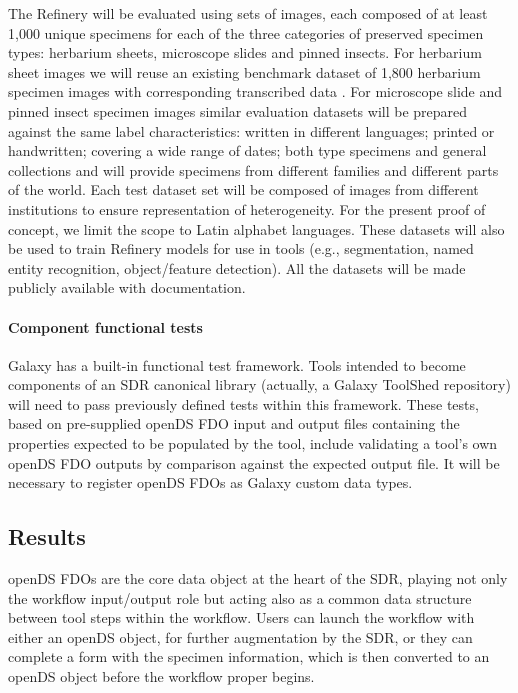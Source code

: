 The Refinery will be evaluated using sets of images, each composed of at
least 1,000 unique specimens for each of the three categories of
preserved specimen types: herbarium sheets, microscope slides and pinned
insects. For herbarium sheet images we will reuse an existing benchmark
dataset of 1,800 herbarium specimen images with corresponding
transcribed data \cite{ch8-59}. For microscope slide and pinned insect
specimen images similar evaluation datasets will be prepared against the
same label characteristics: written in different languages; printed or
handwritten; covering a wide range of dates; both type specimens and
general collections and will provide specimens from different families
and different parts of the world. Each test dataset set will be composed
of images from different institutions to ensure representation of
heterogeneity. For the present proof of concept, we limit the scope to
Latin alphabet languages. These datasets will also be used to train
Refinery models for use in tools (e.g., segmentation, named entity
recognition, object/feature detection). All the datasets will be made
publicly available with documentation.

\paragraph{Component functional tests}\label{component-functional-tests}

Galaxy has a built-in functional test framework. Tools intended to
become components of an SDR canonical library (actually, a Galaxy
ToolShed repository) will need to pass previously defined tests within
this framework. These tests, based on pre-supplied openDS FDO input and
output files containing the properties expected to be populated by the
tool, include validating a tool's own openDS FDO outputs by comparison
against the expected output file. It will be necessary to register
openDS FDOs as Galaxy custom data types.

\subsection{Results}\label{results}

openDS FDOs are the core data object at the heart of the SDR, playing
not only the workflow input/output role but acting also as a common data
structure between tool steps within the workflow. Users can launch the
workflow with either an openDS object, for further augmentation by the
SDR, or they can complete a form with the specimen information, which is
then converted to an openDS object before the workflow proper begins.

